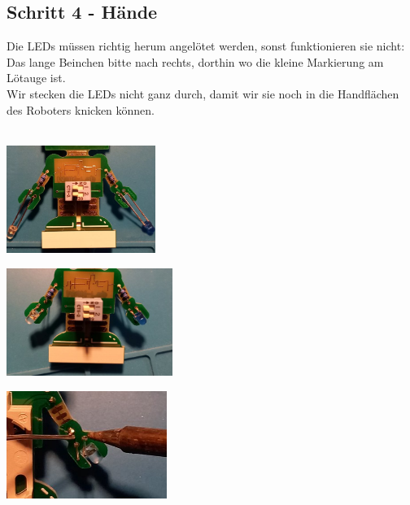 \documentclass[a4paper]{article}
\begin{document}
\subsection{Schritt 4 - Hände}
Die LEDs müssen richtig herum angelötet werden, sonst funktionieren sie nicht: Das lange Beinchen bitte nach rechts, dorthin wo die kleine Markierung am Lötauge ist.\\
Wir stecken die LEDs nicht ganz durch, damit wir sie noch in die Handflächen des Roboters knicken können.\\
\ \\
\begin{minipage}[t]{0.33\textwidth}
  \centering
  \includegraphics[height=3.5cm]{../pictures/LED1.jpg}
  \label{img:LED1}
  \end{minipage}
\begin{minipage}[t]{0.33\textwidth}
  \centering
  \includegraphics[height=3.5cm]{../pictures/LED2.jpg}
  \label{img:LED2}
\end{minipage}
\begin{minipage}[t]{0.33\textwidth}
  \centering
  \includegraphics[height=3.5cm]{../pictures/LED3.jpg}
  \label{img:LED3}
\end{minipage}
\end{document}
